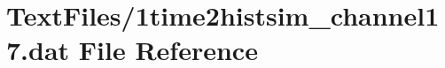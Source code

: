 \hypertarget{1time2histsim__channel17_8dat}{}\section{Text\+Files/1time2histsim\+\_\+channel17.dat File Reference}
\label{1time2histsim__channel17_8dat}
